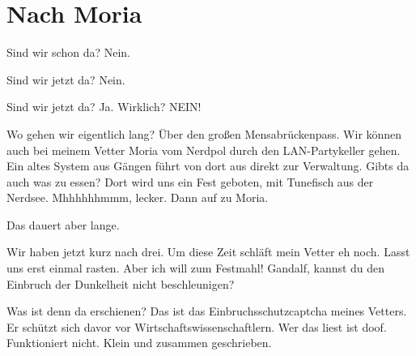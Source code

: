 
\newpage
\section{Nach Moria}
\label{sec:nach-moria}
    \charaktere{\Frodo, \Sum, \Gimli, \Legolars, \Gandalf}
    
\begin{verseplay}[10em]


\s{\Sum} Sind wir schon da?
\s{\Gandalf} Nein.


\s{\Sum} Sind wir jetzt da?
\s{\Gandalf} Nein.


\s{\Sum} Sind wir jetzt da?
\s{\Gandalf} Ja.
\s{\Sum}  Wirklich?
 NEIN!

\s{\Legolars} Wo gehen wir eigentlich lang?
\s{\Gandalf} Über den großen Mensabrückenpass.
\s{\Gimli} Wir können auch bei meinem Vetter Moria vom Nerdpol durch den LAN-Partykeller gehen. Ein altes System aus Gängen führt von dort aus direkt zur Verwaltung.
\s{\Sum} Gibts da auch was zu essen?
\s{\Gimli} Dort wird uns ein Fest geboten, mit Tunefisch aus der Nerdsee.
\s{\Sum} Mhhhhhhmmm, lecker.
\s{\Gandalf} Dann auf zu Moria.


\s{\Sum} Das dauert aber lange.


\s{\Gimli} Wir haben jetzt kurz nach drei. Um diese Zeit schläft mein Vetter eh noch. Lasst uns erst einmal rasten.
\s{\Sam} Aber ich will zum Festmahl!
\s{\Legolars} Gandalf, kannst du den Einbruch der Dunkelheit nicht beschleunigen?

\s{\Frodo} Was ist denn da erschienen?
\s{\Gimli} Das ist das Einbruchsschutzcaptcha meines Vetters. Er schützt sich davor vor Wirtschaftswissenschaftlern.
\s{\Gandalf}  Wer das liest ist doof.
\s{\Legolars}  Funktioniert nicht.
\s{\Gandalf} Klein und zusammen geschrieben.


\end{verseplay}
